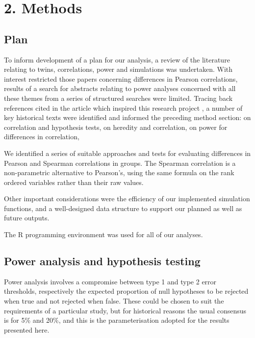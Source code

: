 \chapter*{2. Methods}
\setcounter{chapter}{2}
\setcounter{section}{0}


\section{Plan}


To inform development of a plan for our analysis, a review of the literature relating to twins, correlations, power and simulations was undertaken.  With interest restricted those papers concerning differences in Pearson correlations, results of a search for abstracts relating to power analyses concerned with all these themes from a series of structured searches were limited.  Tracing back references cited in the article which inspired this research project \cite{Verhulst2017}, a number of key historical texts were identified and informed the preceding method section: \cite{David1938} on correlation and hypothesis tests, \cite{Falconer1960} on heredity and correlation,  \cite{Cohen1988} on power for differences in correlation, 

We identified a series of suitable approaches and tests for evaluating differences in Pearson and Spearman correlations in groups.  The Spearman correlation is a non-parametric alternative to Pearson's, using the same formula on the rank ordered variables rather than their raw values.

Other important considerations were the efficiency of our implemented simulation functions, and a well-designed data structure to support our planned as well as future outputs.  

The R programming environment was used for all of our analyses.
 


\section{Power analysis and hypothesis testing} 
Power analysis involves a compromise between type 1 and type 2 error thresholds, respectively the expected proportion of null hypotheses to be rejected when true and not rejected when false.  These could be chosen to suit the requirements of a particular study, but for historical reasons the usual consensus is for 5\% and 20\%, and this is the parameterisation adopted for the results presented here.


